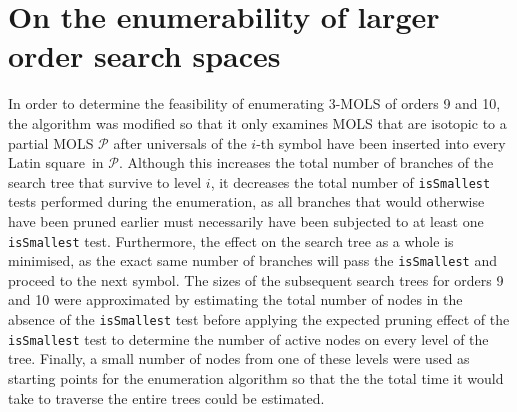 \documentclass[11pt, a4paper]{article}
\newcommand{\iis}{\texttt{isSmallest} }
\newcommand{\lat}{Latin square}
\newcommand{\p}{\mathcal{P}}
\newcounter{ls}
\begin{document}
\section{On the enumerability of larger order search spaces}
In order to determine the feasibility of enumerating   $3$-MOLS of orders 9 and 10, the algorithm was modified so that it only examines MOLS that are isotopic to a partial MOLS $\p$ after universals of the $i$-th symbol have been inserted into every \lat \ in $\p$. Although this increases the total number of branches of the search tree that survive  to level $i$, it decreases the total number of \iis tests performed during the enumeration, as all branches that would otherwise have been pruned earlier must necessarily have been subjected to at least one \iis test. Furthermore, the effect on the search tree as a whole is minimised, as the exact same number of branches will pass the \iis and proceed to the next symbol. The sizes of the subsequent search trees for orders 9 and 10 were approximated by estimating the total number of nodes in the absence of the \iis test before applying the expected pruning effect of the \iis test to determine the number of active nodes on every level of the tree. Finally, a small number of nodes from one of these levels were used as starting points for the enumeration algorithm so that the the total time it would take to traverse the entire trees could be estimated.
\end{document}

